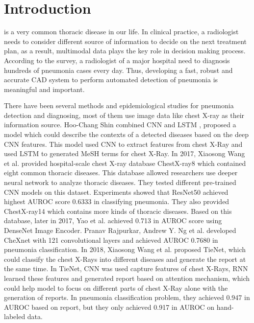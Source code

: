 \section{Introduction}
\label{intro}
% 
% 
% 
% 
 is a very common thoracic disease in our life. In clinical practice, a radiologist needs to consider different source of information to decide on the next treatment plan, as a result, multimodal data plays the key role in decision making process. According to the survey, a radiologist of a major hospital need to diagnosis hundreds of pneumonia cases every day. Thus, developing a fast, robust and accurate CAD system to perform automated detection of pneumonia is meaningful and important. 

There have been several methods and epidemiological studies \cite{Franquet2001Imaging}\cite{Thomas2005Standardized}\cite{deepika2018classification} for pneumonia detection and diagnosing, most of them use image data like chest X-ray as their information source.
Hoo-Chang Shin \cite{Shin2016Learning} combined CNN and LSTM \cite{hochreiter1997long}, proposed a model which could describe the contexts of a detected diseases based on the deep CNN features. This model used CNN to extract features from chest X-Ray and used LSTM to generated MeSH \cite{timmurphy.org} terms for chest X-Ray. In 2017, Xiaosong Wang et al. \cite{Wang2017ChestX} provided hospital-scale chest X-ray database ChestX-ray8 which contained eight common thoracic diseases. This database allowed researchers use deeper neural network to analyze thoracic diseases. They tested different pre-trained CNN models on this dataset. Experiments showed that ResNet50 achieved highest AUROC score 0.6333 in classifying pneumonia. They also provided ChestX-ray14 which contains more kinds of thoracic diseases.
Based on this database, later in 2017, Yao et al. \cite{yao2017learning} achieved 0.713 in AUROC score using DenseNet Image Encoder. Pranav Rajpurkar, Andrew Y. Ng et al. \cite{Rajpurkar2017CheXNet} developed CheXnet with 121 convolutional layers and achieved AUROC 0.7680 in pneumonia classification.
In 2018, Xiaosong Wang et al. \cite{Wang2018TieNet} proposed TieNet, which could classify the chest X-Rays into different diseases and generate the report at the same time. In TieNet, CNN was used capture features of chest X-Rays, RNN learned these features and generated report based on attention mechanism, which could help model to focus on different parts of chest X-Ray alone with the generation of reports. In pneumonia classification problem, they achieved 0.947 in AUROC based on report, but they only achieved 0.917 in AUROC on hand-labeled data. 

